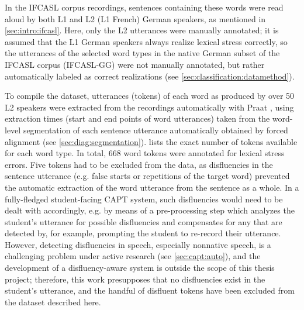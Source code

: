 	In the IFCASL corpus recordings, sentences containing these words were read aloud by both L1 and L2 (L1 French) German speakers, as mentioned in \cref{sec:intro:ifcasl}. Here, only the L2 utterances were manually annotated; it is assumed that the L1 German speakers always realize lexical stress correctly, so the utterances of the selected word types in the native German subset of the IFCASL corpus (IFCASL-GG) were not manually annotated, but rather automatically labeled as correct realizations (see \cref{sec:classification:datamethod}).
	
	
	To compile the dataset, utterances (tokens) of each word as produced by over 50 L2 speakers were extracted from the recordings automatically with Praat \parencite{Boersma2014}, using extraction times (start and end points of word utterances) taken from the word-level segmentation of each sentence utterance automatically obtained by forced alignment (see \cref{sec:diag:segmentation}).
	 lists the exact number of tokens available for each word type. In total, 
	668 word tokens were annotated for lexical stress errors. 
	Five tokens had to be excluded from the data, as disfluencies in the sentence utterance (e.g. false starts or repetitions of the target word) prevented the automatic extraction of the word utterance from the sentence as a whole. In a fully-fledged student-facing CAPT system, such disfluencies would need to be dealt with accordingly, e.g. by means of a pre-processing step which analyzes the student's utterance for possible disfluencies and compensates for any that are detected by, for example, prompting the student to re-record their utterance. However, detecting disfluencies in speech, especially nonnative speech, is a challenging problem under active research 
	(see \cref{sec:capt:auto}),
	and the development of a  disfluency-aware system is outside the scope of this thesis project; therefore, this work presupposes that no disfluencies exist in the student's utterance, and the handful of disfluent tokens have been excluded from the dataset described here.
	
